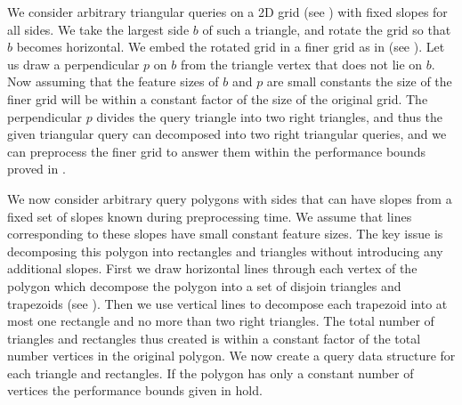 %
We consider arbitrary triangular queries on a 2D grid (see
) with fixed slopes for all sides.
We take the largest side $b$ of such a triangle, and rotate the grid so
that $b$ becomes horizontal. We embed the rotated grid in a finer grid
as in  (see ).
Let us draw a perpendicular $p$ on $b$ from the triangle vertex that
does not lie on $b$. Now assuming that the feature sizes of $b$ and
$p$ are small constants the size of the finer grid will be within a
constant factor of the size of the original grid. The perpendicular $p$
divides the query triangle into two right triangles, and thus the given
triangular query can decomposed into two right triangular queries, and
we can preprocess the finer grid to answer them within the performance
bounds proved in .

%
We now consider arbitrary query polygons with sides that can have slopes
from a fixed set of slopes known during preprocessing time. We assume that
lines corresponding to these slopes have small constant feature sizes.
The key issue is decomposing this polygon into rectangles and triangles
without introducing any additional slopes. First we draw horizontal lines
through each vertex of the polygon which decompose the polygon into a set
of disjoin triangles and trapezoids (see ). Then we
use vertical lines to decompose each trapezoid into at most one rectangle
and no more than two right triangles. The total number of triangles and
rectangles thus created is within a constant factor of the total number
vertices in the original polygon. We now create a query data structure
for each triangle and rectangles. If the polygon has only a constant
number of vertices the performance bounds given in  hold.

